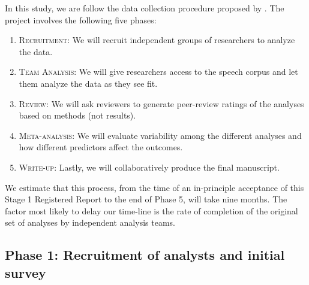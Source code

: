 \documentclass[Review,times,sageh]{sagej}
\providecommand{\tightlist}{\setlength{\itemsep}{0pt}\setlength{\parskip}{0pt}}
\begin{document}
In this study, we are follow the data collection procedure proposed by \citet{Parker2020}.
The project involves the following five phases:

\begin{enumerate}
\def\labelenumi{\arabic{enumi}.}
\tightlist
\item
  \textsc{Recruitment}: We will recruit independent groups of researchers to analyze the data.
\item
  \textsc{Team Analysis}: We will give researchers access to the speech corpus and let them analyze the data as they see fit.
\item
  \textsc{Review}: We will ask reviewers to generate peer-review ratings of the analyses based on methods (not results).
\item
  \textsc{Meta-analysis}: We will evaluate variability among the different analyses and how different predictors affect the outcomes.
\item
  \textsc{Write-up}: Lastly, we will collaboratively produce the final manuscript.
\end{enumerate}

We estimate that this process, from the time of an in-principle acceptance of this Stage 1 Registered Report to the end of Phase 5, will take nine months.
The factor most likely to delay our time-line is the rate of completion of the original set of analyses by independent analysis teams.

\hypertarget{phase-1-recruitment-of-analysts-and-initial-survey}{%
\subsection{Phase 1: Recruitment of analysts and initial survey}\label{phase-1-recruitment-of-analysts-and-initial-survey}}
\end{document}
